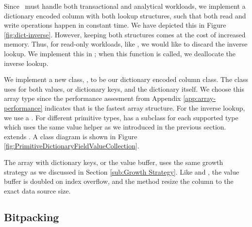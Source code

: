 Since \gap~must handle both transactional and analytical workloads, we implement a dictionary encoded column with both lookup structures, such that both read and write operations happen in constant time. We have depicted this in Figure \ref{fig:dict-inverse}. However, keeping both structures comes at the cost of increased memory. Thus, for read-only workloads, like \gd, we would like to discard the inverse lookup. We implement this in ; when this function is called, we deallocate the inverse lookup. 


We implement a new class, , to be our dictionary encoded column class. The class uses  for both values, or dictionary keys, and the dictionary itself. We choose this array type since the performance assesment from Appendix \ref{app:array-performance} indicates that  is the fastest array structure. For the inverse lookup, we use a . For different primitive types,  has a subclass for each supported type which uses the same value helper as we introduced in the previous section.  extends . A class diagram is shown in Figure \ref{fig:PrimitiveDictionaryFieldValueCollection}.

The array with dictionary keys, or the value buffer, uses the same growth strategy as we discussed in Section \ref{sub:Growth Strategy}. Like  and , the value buffer is doubled on index overflow, and the  method resize the column to the exact data source size.

\subsection{Bitpacking}
\label{compression:bitpacking}

